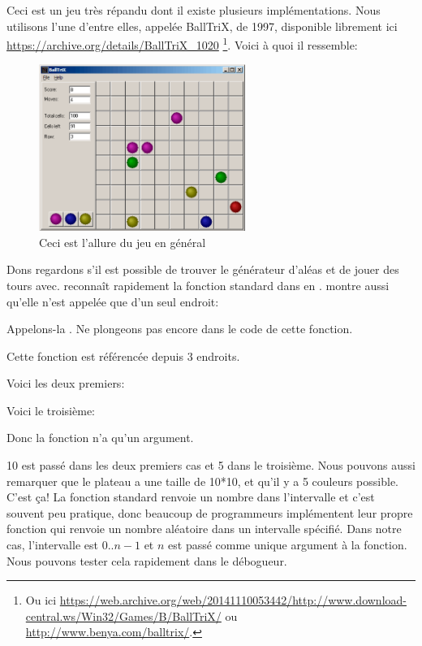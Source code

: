 \clearpage
{}
\label{chap:color_lines}

Ceci est un jeu très répandu dont il existe plusieurs implémentations. Nous utilisons
l'une d'entre elles, appelée BallTriX, de 1997, disponible librement ici \url{https://archive.org/details/BallTriX_1020}
\footnote{Ou ici \url{https://web.archive.org/web/20141110053442/http://www.download-central.ws/Win32/Games/B/BallTriX/} ou \url{http://www.benya.com/balltrix/}.}.
Voici à quoi il ressemble:%

\begin{figure}[H]
\centering
\includegraphics[width=0.6\textwidth]{examples/lines/1.png}
\caption{Ceci est l'allure du jeu en général}
\label{fig:lines_1}
\end{figure}

\clearpage
{}

Dons regardons s'il est possible de trouver le générateur d'aléas et de jouer des tours avec.
\IDA reconnaît rapidement la fonction standard  dans  en .
\IDA montre aussi qu'elle n'est appelée que d'un seul endroit:



Appelons-la .
Ne plongeons pas encore dans le code de cette fonction.

Cette fonction est référencée depuis 3 endroits.

Voici les deux premiers:



Voici le troisième:



Donc la fonction n'a qu'un argument.

10 est passé dans les deux premiers cas et 5 dans le troisième.
Nous pouvons aussi remarquer que le plateau a une taille de 10*10, et qu'il y a 5
couleurs possible.
C'est ça!
La fonction standard  renvoie un nombre dans l'intervalle 
et c'est souvent peu pratique, donc beaucoup de programmeurs implémentent leur propre
fonction qui renvoie un nombre aléatoire dans un intervalle spécifié.
Dans notre cas, l'intervalle est $0..n-1$ et $n$ est passé comme unique argument
à la fonction.
Nous pouvons tester cela rapidement dans le débogueur.

